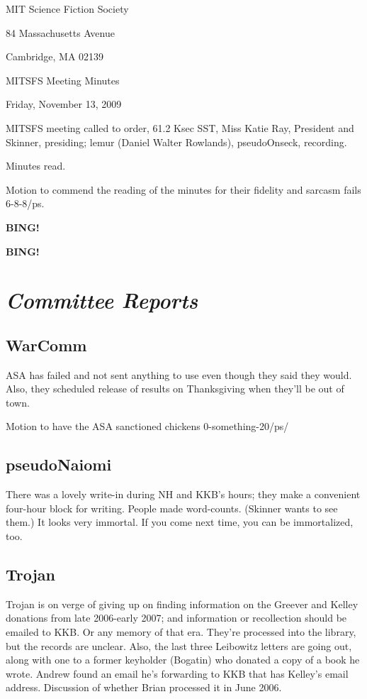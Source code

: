 \documentclass[10pt]{article}
\newcommand{\bing}{{\bf BING!} }
\newcommand{\goto}[1]{\bing \vskip 12pt \section*{{\em{#1}}}}
\newcommand{\skinner}{Miss Katie Ray, President and Skinner}
\newcommand{\onseck}{lemur (Daniel Walter Rowlands), pseudoOnseck}
\newcommand{\meetingdate}{Friday, November 13, 2009}
\begin{document}
\begin{center}

MIT Science Fiction Society

84 Massachusetts Avenue

Cambridge, MA 02139

\vspace{12pt}

MITSFS Meeting Minutes

\meetingdate

\end{center}

\vspace{18pt}

\setlength{\parskip}{6pt}

\noindent
MITSFS meeting called to order, 61.2 Ksec SST,
\skinner, presiding; \onseck, recording.

Minutes read.

Motion to commend the reading of the minutes for their fidelity and sarcasm fails
6-8-8/ps.

\bing

\goto{Committee Reports}

\subsection{WarComm}
ASA has failed and not sent anything to use even though they said they would.
Also, they scheduled release of results on Thanksgiving when they'll be out
of town.

Motion to have the ASA sanctioned chickens 0-something-20/ps/

\subsection{pseudoNaiomi}
There was a lovely write-in during NH and KKB's hours; they make a convenient
four-hour block for writing.  People made word-counts.  (Skinner wants to see
them.)  It looks very immortal.  If you come next time, you can be immortalized,
too.

\subsection{Trojan}
Trojan is on verge of giving up on finding information on the Greever and Kelley
donations from late 2006-early 2007; and information or recollection should be
emailed to KKB.  Or any memory of that era.  They're processed into the library,
but the records are unclear.  Also, the last three Leibowitz letters are going
out, along with one to a former keyholder (Bogatin) who donated a copy of a
book he wrote.  Andrew found an email he's forwarding to KKB that has Kelley's
email address.  Discussion of whether Brian processed it in June 2006.
\end{document}
